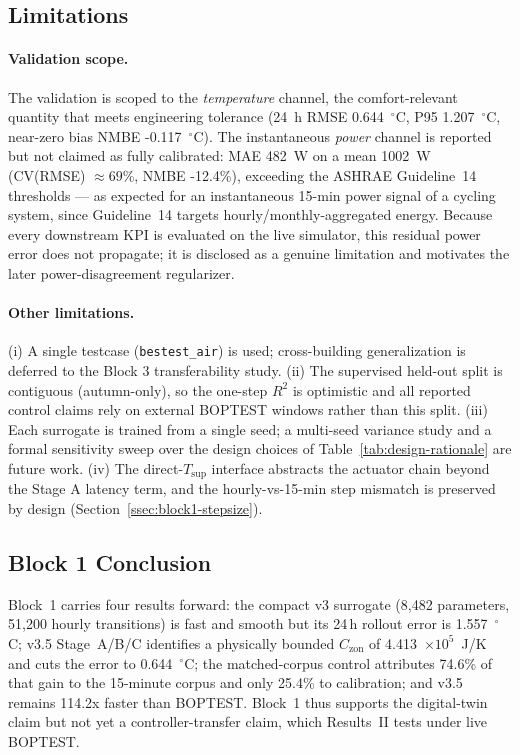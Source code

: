 \documentclass[11pt,a4paper]{article}
\newcommand{\Czon}{\ensuremath{C_{\mathrm{zon}}}}
\newcommand{\Tsupply}{\ensuremath{T_{\mathrm{sup}}}}
\begin{document}
\subsection{Limitations}
\label{ssec:block1-limitations}

\paragraph{Validation scope.}
The validation is scoped to the \emph{temperature} channel, the comfort-relevant quantity that meets engineering tolerance (24~h RMSE 0.644~$^\circ$C, P95 1.207~$^\circ$C, near-zero bias NMBE -0.117~$^\circ$C). The instantaneous \emph{power} channel is reported but not claimed as fully calibrated: MAE 482~W on a mean 1002~W (CV(RMSE) $\approx69$\%, NMBE -12.4\%), exceeding the ASHRAE Guideline~14 thresholds --- as expected for an instantaneous 15-min power signal of a cycling system, since Guideline~14 targets hourly/monthly-aggregated energy. Because every downstream KPI is evaluated on the live simulator, this residual power error does not propagate; it is disclosed as a genuine limitation and motivates the later power-disagreement regularizer.

\paragraph{Other limitations.}
(i) A single testcase (\texttt{bestest\_air}) is used; cross-building generalization is deferred to the Block 3 transferability study. (ii) The supervised held-out split is contiguous (autumn-only), so the one-step \(R^2\) is optimistic and all reported control claims rely on external BOPTEST windows rather than this split. (iii) Each surrogate is trained from a single seed; a multi-seed variance study and a formal sensitivity sweep over the design choices of Table~\ref{tab:design-rationale} are future work. (iv) The direct-\Tsupply{} interface abstracts the actuator chain beyond the Stage A latency term, and the hourly-vs-15-min step mismatch is preserved by design (Section~\ref{ssec:block1-stepsize}).

\subsection{Block 1 Conclusion}
\label{ssec:block1-conclusion}

Block~1 carries four results forward: the compact v3 surrogate (8,482 parameters, 51,200 hourly transitions) is fast and smooth but its 24\,h rollout error is 1.557~$^\circ$C; v3.5 Stage~A/B/C identifies a physically bounded $\Czon$ of 4.413~$\times10^5$~J/K and cuts the error to 0.644~$^\circ$C; the matched-corpus control attributes 74.6\% of that gain to the 15-minute corpus and only 25.4\% to calibration; and v3.5 remains 114.2x faster than BOPTEST. Block~1 thus supports the digital-twin claim but not yet a controller-transfer claim, which Results~II tests under live BOPTEST.

\FloatBarrier
\end{document}

